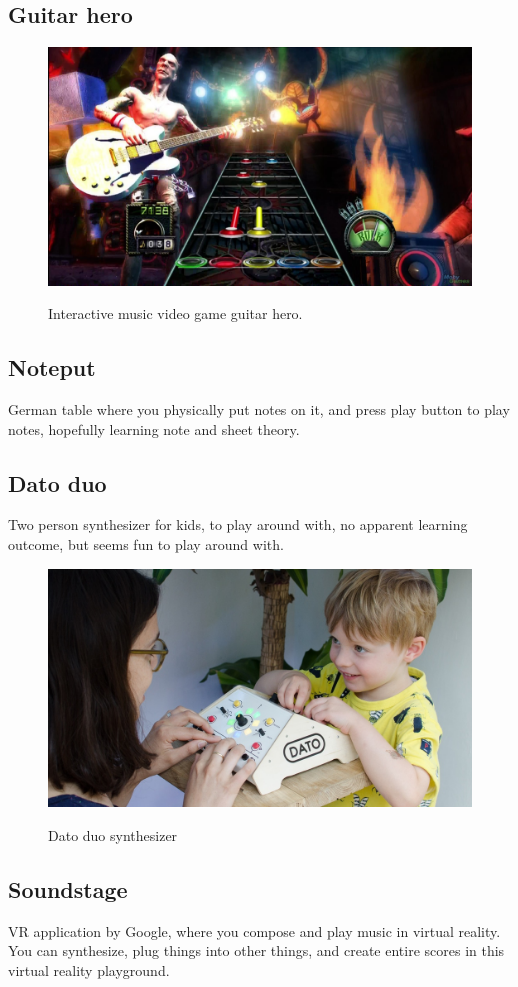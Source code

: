 	\subsection{Guitar hero}\label{sec:guitarHero}
		\begin{figure}[H]
			\centering
			\includegraphics[width=0.7\linewidth]{figure/Analysis/guitarhero}
			\label{fig:guitarHero}
			\caption{Interactive music video game guitar hero.}
		\end{figure}
	\subsection{Noteput}
		German table where you physically put notes on it, and press play button to play notes, hopefully learning note and sheet theory.
	\subsection{Dato duo}
		Two person synthesizer for kids, to play around with, no apparent learning outcome, but seems fun to play around with.
		\begin{figure}[H]
			\centering
			\includegraphics[width=0.7\linewidth]{figure/Analysis/datoduo}
			\label{fig:datoduo}
			\caption{Dato duo synthesizer}
		\end{figure}
	\subsection{Soundstage}
		VR application by Google, where you compose and play music in virtual reality. You can synthesize, plug things into other things, and create entire scores in this virtual reality playground.
		
